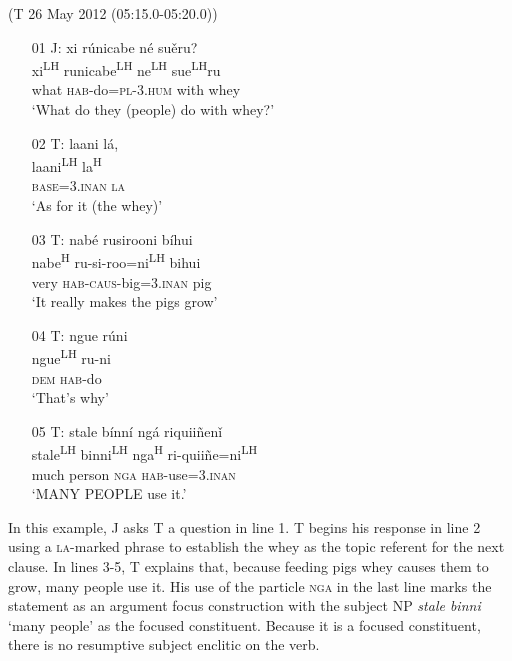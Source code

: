 \ea\label{objectni}(T 26 May 2012 (05:15.0-05:20.0))
\begin{itemize}

\item[01 J:]
xi r\'{u}nicabe n\'{e} su\v{e}ru?  \\
xi\textsuperscript{LH} runicabe\textsuperscript{LH} ne\textsuperscript{LH} sue\textsuperscript{LH}ru  \\
what \textsc{hab}-do=\textsc{pl}-\textsc{3.hum} with whey  \\
\glt `What do they (people) do with whey?'


\item[02 T:]
\glll laani l\'{a},  \\
laani\textsuperscript{LH} la\textsuperscript{H}  \\
\textsc{base}=\textsc{3.inan} \textsc{la}  \\
\glt `As for it (the whey)'


\item[03 T:]
\glll nab\'{e} rusirooni b\'{i}hui  \\
nabe\textsuperscript{H} ru-si-roo=ni\textsuperscript{LH} bihui  \\
very \textsc{hab}-\textsc{caus}-big=\textsc{3.inan} pig  \\
\glt `It really makes the pigs grow' 


\item[04 T:]
\glll ngue r\'{u}ni  \\
ngue\textsuperscript{LH} ru-ni  \\
\textsc{dem} \textsc{hab}-do  \\
\glt `That's why'


\item[05 T:]
\glll stale b\'{i}nn\'{i} ng\'{a} riquii\~{n}en\v{i}  \\
stale\textsuperscript{LH} binni\textsuperscript{LH} nga\textsuperscript{H} ri-quii\~{n}e=ni\textsuperscript{LH}  \\
much person \textsc{nga} \textsc{hab}-use=\textsc{3.inan}  \\
\glt `MANY PEOPLE use it.' 


\end{itemize}
\z
In this example, J asks T a question in line 1. T begins his response in line 2 using a \textsc{la}-marked phrase to establish the whey as the topic referent for the next clause. In lines 3-5, T explains that, because feeding pigs whey causes them to grow, many people use it. His use of the particle \textsc{nga} in the last line marks the statement as an argument focus construction with the subject NP \textit{stale binni} `many people' as the focused constituent. Because it is a focused constituent, there is no resumptive subject enclitic on the verb. 

